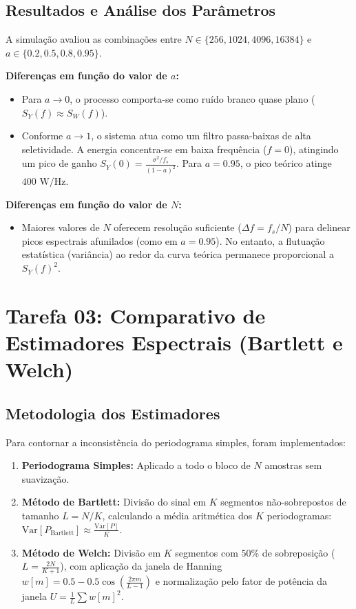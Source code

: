 \documentclass[12pt,a4paper]{article}
\begin{document}
\subsection{Resultados e Análise dos Parâmetros}
A simulação avaliou as combinações entre $N \in \{256, 1024, 4096, 16384\}$ e $a \in \{0.2, 0.5, 0.8, 0.95\}$.

\textbf{Diferenças em função do valor de $a$:}
\begin{itemize}
    \item Para $a \to 0$, o processo comporta-se como ruído branco quase plano ($S_Y(f) \approx S_W(f)$).
    \item Conforme $a \to 1$, o sistema atua como um filtro passa-baixas de alta seletividade. A energia concentra-se em baixa frequência ($f=0$), atingindo um pico de ganho $S_Y(0) = \frac{\sigma^2 / f_s}{(1-a)^2}$. Para $a=0.95$, o pico teórico atinge $400 \text{ W/Hz}$.
\end{itemize}

\textbf{Diferenças em função do valor de $N$:}
\begin{itemize}
    \item Maiores valores de $N$ oferecem resolução suficiente ($\Delta f = f_s/N$) para delinear picos espectrais afunilados (como em $a=0.95$). No entanto, a flutuação estatística (variância) ao redor da curva teórica permanece proporcional a $S_Y(f)^2$.
\end{itemize}

\section{Tarefa 03: Comparativo de Estimadores Espectrais (Bartlett e Welch)}

\subsection{Metodologia dos Estimadores}
Para contornar a inconsistência do periodograma simples, foram implementados:
\begin{enumerate}
    \item \textbf{Periodograma Simples:} Aplicado a todo o bloco de $N$ amostras sem suavização.
    \item \textbf{Método de Bartlett:} Divisão do sinal em $K$ segmentos não-sobrepostos de tamanho $L = N/K$, calculando a média aritmética dos $K$ periodogramas: $\text{Var}[P_{\text{Bartlett}}] \approx \frac{\text{Var}[P]}{K}$.
    \item \textbf{Método de Welch:} Divisão em $K$ segmentos com $50\%$ de sobreposição ($L = \frac{2N}{K+1}$), com aplicação da janela de Hanning $w[m] = 0.5 - 0.5\cos\left(\frac{2\pi m}{L-1}\right)$ e normalização pelo fator de potência da janela $U = \frac{1}{L}\sum w[m]^2$.
\end{enumerate}
\end{document}
